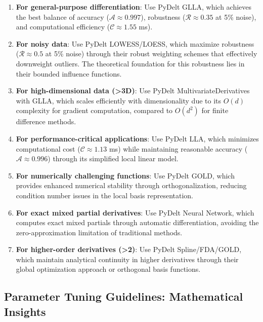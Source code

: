 \documentclass[10pt,journal,compsoc]{IEEEtran}
\begin{document}
\begin{enumerate}
    \item \textbf{For general-purpose differentiation}: Use PyDelt GLLA, which achieves the best balance of accuracy ($\mathcal{A} \approx 0.997$), robustness ($\mathcal{R} \approx 0.35$ at 5\% noise), and computational efficiency ($\mathcal{C} \approx 1.55$ ms).
    
    \item \textbf{For noisy data}: Use PyDelt LOWESS/LOESS, which maximize robustness ($\mathcal{R} \approx 0.5$ at 5\% noise) through their robust weighting schemes that effectively downweight outliers. The theoretical foundation for this robustness lies in their bounded influence functions.
    
    \item \textbf{For high-dimensional data (>3D)}: Use PyDelt MultivariateDerivatives with GLLA, which scales efficiently with dimensionality due to its $O(d)$ complexity for gradient computation, compared to $O(d^2)$ for finite difference methods.
    
    \item \textbf{For performance-critical applications}: Use PyDelt LLA, which minimizes computational cost ($\mathcal{C} \approx 1.13$ ms) while maintaining reasonable accuracy ($\mathcal{A} \approx 0.996$) through its simplified local linear model.
    
    \item \textbf{For numerically challenging functions}: Use PyDelt GOLD, which provides enhanced numerical stability through orthogonalization, reducing condition number issues in the local basis representation.
    
    \item \textbf{For exact mixed partial derivatives}: Use PyDelt Neural Network, which computes exact mixed partials through automatic differentiation, avoiding the zero-approximation limitation of traditional methods.
    
    \item \textbf{For higher-order derivatives (>2)}: Use PyDelt Spline/FDA/GOLD, which maintain analytical continuity in higher derivatives through their global optimization approach or orthogonal basis functions.
\end{enumerate}

\subsection{Parameter Tuning Guidelines: Mathematical Insights}
\end{document}
